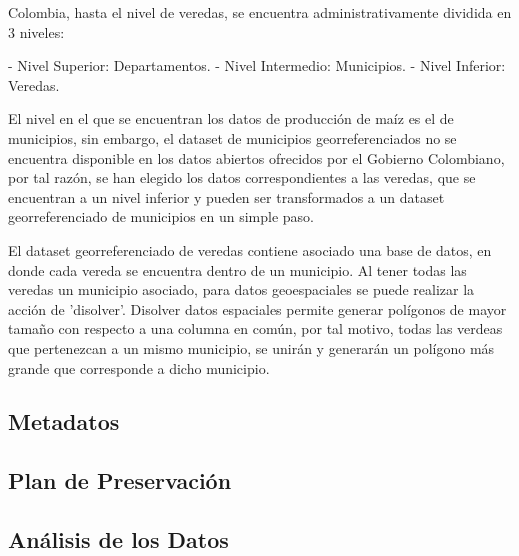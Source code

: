 \documentclass[12pt, spanish]{article}
\begin{document}
Colombia, hasta el nivel de veredas, se encuentra administrativamente dividida en 3 niveles:

- Nivel Superior: Departamentos.
- Nivel Intermedio: Municipios.
- Nivel Inferior: Veredas.

El nivel en el que se encuentran los datos de producción de maíz es el de municipios, sin embargo, el dataset de municipios georreferenciados no se encuentra disponible en los datos abiertos ofrecidos por el Gobierno Colombiano, por tal razón, se han elegido los datos correspondientes a las veredas, que se encuentran a un nivel inferior y pueden ser transformados a un dataset georreferenciado de municipios en un simple paso.

El dataset georreferenciado de veredas contiene asociado una base de datos, en donde cada vereda se encuentra dentro de un municipio. Al tener todas las veredas un municipio asociado, para datos geoespaciales se puede realizar la acción de 'disolver'. Disolver datos espaciales permite generar polígonos de mayor tamaño con respecto a una columna en común, por tal motivo, todas las verdeas que pertenezcan a un mismo municipio, se unirán y generarán un polígono más grande que corresponde a dicho municipio.


\subsection{Metadatos}

\subsection{Plan de Preservación}

\subsection{Análisis de los Datos}




































\end{document}
